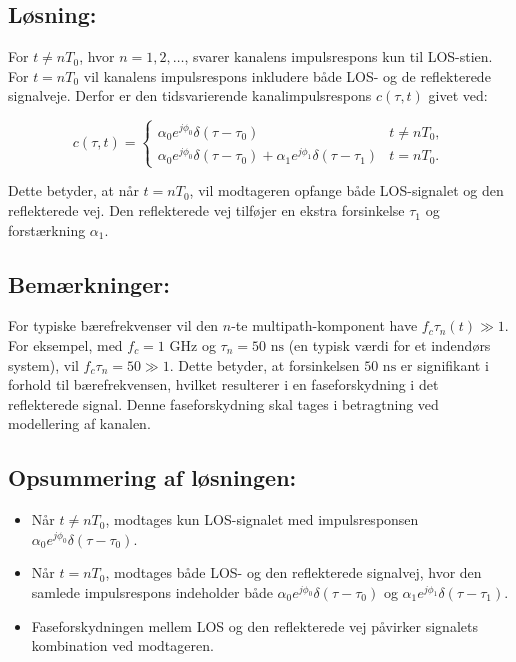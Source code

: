 \documentclass[a4paper,12pt]{book}
\begin{document}
	\subsection*{Løsning:}
	For \( t \neq nT_0 \), hvor \( n = 1, 2, \dots \), svarer kanalens impulsrespons kun til LOS-stien. For \( t = nT_0 \) vil kanalens impulsrespons inkludere både LOS- og de reflekterede signalveje. Derfor er den tidsvarierende kanalimpulsrespons \( c(\tau, t) \) givet ved:
	
	\[
	c(\tau, t) =
	\begin{cases} 
		\alpha_0 e^{j \phi_0} \delta(\tau - \tau_0) & t \neq nT_0, \\
		\alpha_0 e^{j \phi_0} \delta(\tau - \tau_0) + \alpha_1 e^{j \phi_1} \delta(\tau - \tau_1) & t = nT_0.
	\end{cases}
	\]
	
	Dette betyder, at når \( t = nT_0 \), vil modtageren opfange både LOS-signalet og den reflekterede vej. Den reflekterede vej tilføjer en ekstra forsinkelse \( \tau_1 \) og forstærkning \( \alpha_1 \).
	
	\subsection*{Bemærkninger:}
	For typiske bærefrekvenser vil den \( n \)-te multipath-komponent have \( f_c \tau_n(t) \gg 1 \). For eksempel, med \( f_c = 1 \text{ GHz} \) og \( \tau_n = 50 \text{ ns} \) (en typisk værdi for et indendørs system), vil \( f_c \tau_n = 50 \gg 1 \). Dette betyder, at forsinkelsen \( 50 \text{ ns} \) er signifikant i forhold til bærefrekvensen, hvilket resulterer i en faseforskydning i det reflekterede signal. Denne faseforskydning skal tages i betragtning ved modellering af kanalen.
	
	\subsection*{Opsummering af løsningen:}
	\begin{itemize}
		\item Når \( t \neq nT_0 \), modtages kun LOS-signalet med impulsresponsen \( \alpha_0 e^{j \phi_0} \delta(\tau - \tau_0) \).
		\item Når \( t = nT_0 \), modtages både LOS- og den reflekterede signalvej, hvor den samlede impulsrespons indeholder både \( \alpha_0 e^{j \phi_0} \delta(\tau - \tau_0) \) og \( \alpha_1 e^{j \phi_1} \delta(\tau - \tau_1) \).
		\item Faseforskydningen mellem LOS og den reflekterede vej påvirker signalets kombination ved modtageren.
	\end{itemize}
	
\end{document}
